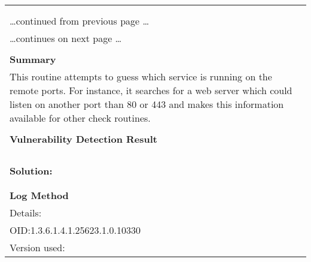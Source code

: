 \documentclass{article}
\begin{document}
\begin{longtable}{|p{}|}
\hline
\rowcolor{gvm_log}{\color{white}{Log (CVSS: 0.0) }}\\
\rowcolor{gvm_log}{\color{white}{NVT: Services}}\\
\hline
\endfirsthead
\hfill\ldots continued from previous page \ldots \\
\hline
\endhead
\hline
\ldots continues on next page \ldots \\
\endfoot
\hline
\endlastfoot
\\
\textbf{Summary}\\
This routine attempts to guess which service is running on the
  remote ports. For instance, it searches for a web server which could listen on another port than
  80 or 443 and makes this information available for other check routines.\\

        \hline
        \\
\textbf{Vulnerability Detection Result}\\
\rowcolor{white}{\verb=An FTP server is running on this port.=}\\
\rowcolor{white}{\verb=Here is its banner : =}\\
\rowcolor{white}{\verb=220 FRITZ!Box7490 FTP server ready.=}\\

          \hline
          \\
\textbf{Solution:}\\
\\


        \hline
        \\
\textbf{Log Method}\\
Details:
\rowcolor{white}{\verb=Services=}\\
OID:1.3.6.1.4.1.25623.1.0.10330\\
Version used:
\rowcolor{white}{\verb=2021-03-15T10:42:03Z=}\\
\end{longtable}
\end{document}
